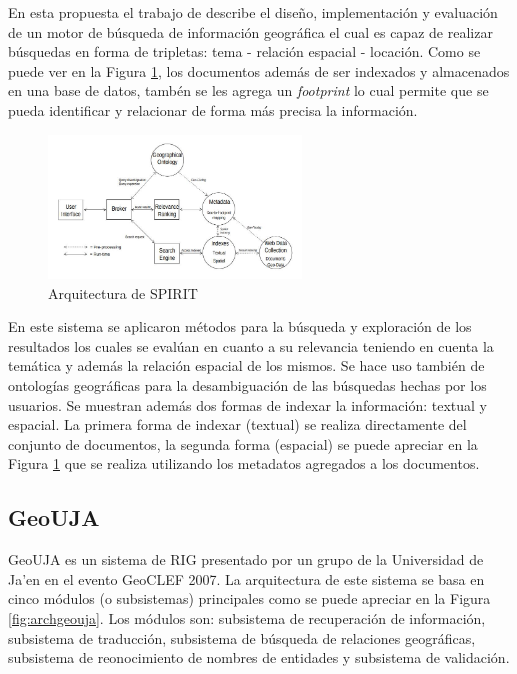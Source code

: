 \documentclass{llncs}
\begin{document}
En esta propuesta el trabajo de \cite{purves2007} describe el diseño,
implementación y evaluación de un motor de búsqueda de información geográfica
el cual es capaz de realizar búsquedas en forma de tripletas: tema - relación
espacial - locación. Como se puede ver en la Figura \ref{fig:archspirit}, los
documentos además de ser indexados y almacenados en una base de datos, tambén
se les agrega un \emph{footprint} lo cual permite que se pueda identificar y
relacionar de forma más precisa la información.

\begin{figure}[htb]%
	\begin{center}
		\includegraphics[width=0.6\textwidth]{spirit_arch.jpg}
	\end{center}
	\caption{Arquitectura de SPIRIT \cite{purves2007}}
	\label{fig:archspirit}
\end{figure}

En este sistema se aplicaron métodos para la búsqueda y exploración de los
resultados los cuales se evalúan en cuanto a su relevancia teniendo en cuenta
la temática y además la relación espacial de los mismos. Se hace uso también de
ontologías geográficas para la desambiguación de las búsquedas hechas por los
usuarios. Se muestran además dos formas de indexar la información: textual y
espacial. La primera forma de indexar (textual) se realiza directamente del
conjunto de documentos, la segunda forma (espacial) se puede apreciar en la
Figura \ref{fig:archspirit} que se realiza utilizando los metadatos agregados a
los documentos.

\subsection{GeoUJA}\label{sec:archgeouja}

GeoUJA \cite{perea2007} es un sistema de RIG presentado por un grupo de la
Universidad de Ja'en en el evento GeoCLEF 2007. La arquitectura de este sistema
se basa en cinco módulos (o subsistemas) principales como se puede apreciar en
la Figura \ref{fig:archgeouja}. Los módulos son: subsistema de recuperación de
información, subsistema de traducción, subsistema de búsqueda de relaciones
geográficas, subsistema de reonocimiento de nombres de entidades y subsistema
de validación.
\end{document}
